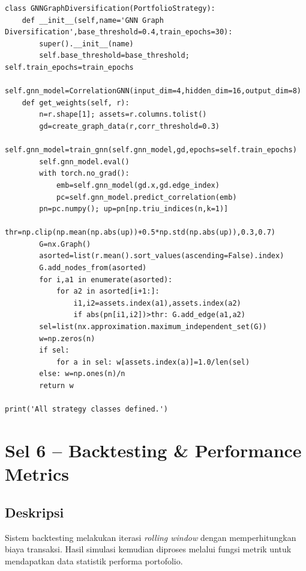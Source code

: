 \documentclass[12pt,a4paper]{article}
\begin{document}
\begin{lstlisting}[caption={Implementasi berbagai strategi portofolio}]
class GNNGraphDiversification(PortfolioStrategy):
    def __init__(self,name='GNN Graph Diversification',base_threshold=0.4,train_epochs=30):
        super().__init__(name)
        self.base_threshold=base_threshold; self.train_epochs=train_epochs
        self.gnn_model=CorrelationGNN(input_dim=4,hidden_dim=16,output_dim=8)
    def get_weights(self, r):
        n=r.shape[1]; assets=r.columns.tolist()
        gd=create_graph_data(r,corr_threshold=0.3)
        self.gnn_model=train_gnn(self.gnn_model,gd,epochs=self.train_epochs)
        self.gnn_model.eval()
        with torch.no_grad():
            emb=self.gnn_model(gd.x,gd.edge_index)
            pc=self.gnn_model.predict_correlation(emb)
        pn=pc.numpy(); up=pn[np.triu_indices(n,k=1)]
        thr=np.clip(np.mean(np.abs(up))+0.5*np.std(np.abs(up)),0.3,0.7)
        G=nx.Graph()
        asorted=list(r.mean().sort_values(ascending=False).index)
        G.add_nodes_from(asorted)
        for i,a1 in enumerate(asorted):
            for a2 in asorted[i+1:]:
                i1,i2=assets.index(a1),assets.index(a2)
                if abs(pn[i1,i2])>thr: G.add_edge(a1,a2)
        sel=list(nx.approximation.maximum_independent_set(G))
        w=np.zeros(n)
        if sel:
            for a in sel: w[assets.index(a)]=1.0/len(sel)
        else: w=np.ones(n)/n
        return w

print('All strategy classes defined.')
\end{lstlisting}

\section{Sel 6 -- Backtesting \& Performance Metrics}

\subsection{Deskripsi}
Sistem backtesting melakukan iterasi \textit{rolling window} dengan memperhitungkan biaya transaksi. Hasil simulasi kemudian diproses melalui fungsi metrik untuk mendapatkan data statistik performa portofolio.
\end{document}
